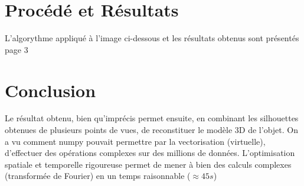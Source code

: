 \documentclass{article}
\begin{document}
\begin{multicols}{2}
\section{Procédé et Résultats}

L'algorythme appliqué à l'image ci-dessous et les résultats obtenus sont présentés page 3 \\
\;\;\; 

\section{Conclusion}
	Le résultat obtenu, bien qu'imprécis permet ensuite, en combinant les silhouettes obtenues de plusieurs points de vues, de reconstituer le modèle 3D de l'objet. On a vu comment numpy pouvait permettre par la vectorisation (virtuelle), d'effectuer des opérations complexes sur des millions de données. L'optimisation spatiale et temporelle rigoureuse permet de mener à bien des calculs complexes (transformée de Fourier) en un temps raisonnable ($\approx 45s$)

\end{multicols}

\newcommand{\tabinc}[2] {
	\smash{\raisebox{-1\height}{\texttt{[image: \#2]}}}\vspace{#1}
	}
\end{document}
